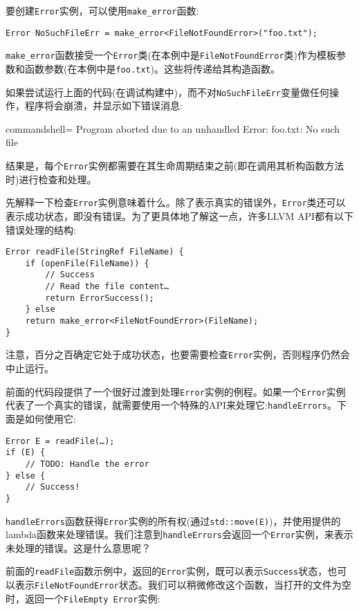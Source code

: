 要创建\texttt{Error}实例，可以使用\texttt{make\_error}函数:

\begin{lstlisting}[style=styleCXX]
Error NoSuchFileErr = make_error<FileNotFoundError>("foo.txt");
\end{lstlisting}

\texttt{make\_error}函数接受一个\texttt{Error}类(在本例中是\texttt{FileNotFoundError}类)作为模板参数和函数参数(在本例中是\texttt{foo.txt})。这些将传递给其构造函数。

如果尝试运行上面的代码(在调试构建中)，而不对\texttt{NoSuchFileErr}变量做任何操作，程序将会崩溃，并显示如下错误消息:

\begin{tcblisting}{commandshell={}}
Program aborted due to an unhandled Error:
foo.txt: No such file
\end{tcblisting}

结果是，每个\texttt{Error}实例都需要在其生命周期结束之前(即在调用其析构函数方法时)进行检查和处理。

先解释一下检查\texttt{Error}实例意味着什么。除了表示真实的错误外，\texttt{Error}类还可以表示成功状态，即没有错误。为了更具体地了解这一点，许多LLVM API都有以下错误处理的结构:

\begin{lstlisting}[style=styleCXX]
Error readFile(StringRef FileName) {
	if (openFile(FileName)) {
		// Success
		// Read the file content…
		return ErrorSuccess();
	} else
	return make_error<FileNotFoundError>(FileName);
}
\end{lstlisting}

注意，百分之百确定它处于成功状态，也要需要检查\texttt{Error}实例，否则程序仍然会中止运行。

前面的代码段提供了一个很好过渡到处理\texttt{Error}实例的例程。如果一个\texttt{Error}实例代表了一个真实的错误，就需要使用一个特殊的API来处理它:\texttt{handleErrors}。下面是如何使用它:

\begin{lstlisting}[style=styleCXX]
Error E = readFile(…);
if (E) {
	// TODO: Handle the error
} else {
    // Success!
}
\end{lstlisting}

\texttt{handleErrors}函数获得\texttt{Error}实例的所有权(通过\texttt{std::move(E)})，并使用提供的lambda函数来处理错误。我们注意到\texttt{handleErrors}会返回一个\texttt{Error}实例，来表示未处理的错误。这是什么意思呢？

前面的\texttt{readFile}函数示例中，返回的\texttt{Error}实例，既可以表示\texttt{Success}状态，也可以表示\texttt{FileNotFoundError}状态。我们可以稍微修改这个函数，当打开的文件为空时，返回一个\texttt{FileEmpty Error}实例:

